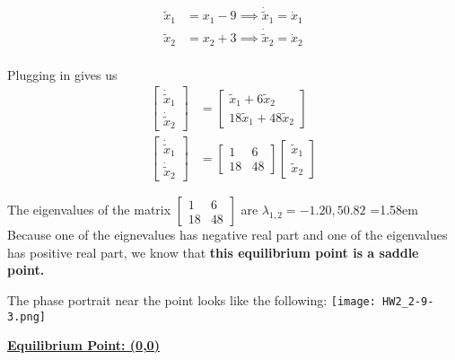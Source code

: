 \documentclass{article}
\begin{document}
  \begin{align*}
    \tilde{x}_1 &= x_1-9 \implies \dot{\tilde{x}}_1 = \dot{x}_1 \\
    \tilde{x}_2 &= x_2+3 \implies \dot{\tilde{x}}_2 = \dot{x}_2 \\
  \end{align*}
  
  \indent Plugging in gives us
  \begin{align*}
    \begin{bmatrix}
      \dot{\tilde{x}}_1 \\
      \dot{\tilde{x}}_2
    \end{bmatrix} &=
    \begin{bmatrix}
      \tilde{x}_1 + 6\tilde{x}_2 \\
      18\tilde{x}_1 + 48\tilde{x}_2
    \end{bmatrix} \\
    \begin{bmatrix}
      \dot{\tilde{x}}_1 \\
      \dot{\tilde{x}}_2
    \end{bmatrix} &=
    \begin{bmatrix}
      1 & 6 \\
      18 & 48
    \end{bmatrix} 
    \begin{bmatrix}
      \tilde{x}_1 \\
      \tilde{x}_2
    \end{bmatrix} 
  \end{align*}


  The eigenvalues of the matrix $\begin{bmatrix}
      1 & 6 \\
      18 & 48
  \end{bmatrix}$ are $\lambda_{1,2} = -1.20, 50.82$ \newline \newline
  \hangindent=1.58em
   Because one of the eignevalues has negative real part and one of
  the eigenvalues has positive real part, we know that \textbf{this
  equilibrium point is a saddle point.} \newline

The phase portrait near the point looks like the following: \hspace{4mm}
\texttt{[image: HW2\_2-9-3.png]} \newline \newline

  \textbf{\underline{Equilibrium Point: (0,\hspace{0.8mm}0)}}
\end{document}
